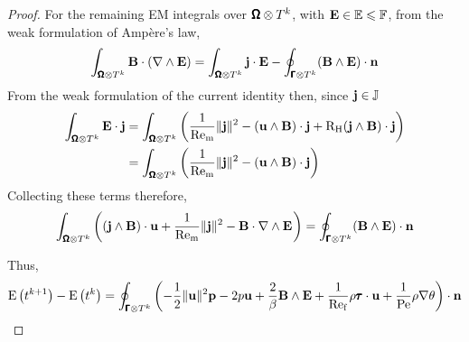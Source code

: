 \begin{proof}
            For the remaining EM integrals over $\pmb{\mathsf{\Omega}}\otimes T^{k}$, with $\mathbf{E}  \in  \mathbb{E}  \leqslant  \mathbb{F}$, from the weak formulation of Ampère's law,
            \begin{equation}
                \int_{\pmb{\mathsf{\Omega}}\otimes T^{k}}\mathbf{B}\cdot(\nabla\wedge\mathbf{E})  =  \int_{\pmb{\mathsf{\Omega}}\otimes T^{k}}\mathbf{j}\cdot\mathbf{E} - \oint_{\pmb{\mathsf{\Gamma}}\otimes T^{k}}(\mathbf{B}\wedge\mathbf{E})\cdot\mathbf{n}
            \end{equation}
            From the weak formulation of the current identity then, since $\mathbf{j}  \in  \mathbb{J}$
            \begin{align}
                \int_{\pmb{\mathsf{\Omega}}\otimes T^{k}}\mathbf{E}\cdot\mathbf{j}  &=  \int_{\pmb{\mathsf{\Omega}}\otimes T^{k}}\left(\frac{1}{\mathrm{Re}_{\mathrm{m}}}\|\mathbf{j}\|^{2} - (\mathbf{u}\wedge\mathbf{B})\cdot\mathbf{j} + \mathrm{R}_{\mathrm{H}}(\mathbf{j}\wedge\mathbf{B})\cdot\mathbf{j}\right)  \\
                &=  \int_{\pmb{\mathsf{\Omega}}\otimes T^{k}}\left(\frac{1}{\mathrm{Re}_{\mathrm{m}}}\|\mathbf{j}\|^{2} - (\mathbf{u}\wedge\mathbf{B})\cdot\mathbf{j}\right)
            \end{align}
            Collecting these terms therefore,
            \begin{equation}
                \int_{\bfOmega\otimes T^{k}}\left((\bfj\wedge\bfB)\cdot\bfu + \frac{1}{\rmRem}\|\bfj\|^{2} - \bfB\cdot\nabla\wedge\bfE\tall\right)  =  \oint_{\bfGamma\otimes T^{k}}(\bfB\wedge\bfE)\cdot\bfn
            \end{equation}
    
            Thus,
            \begin{equation}
                \mathrm{E}\left(t^{k + 1}\right) - \mathrm{E}\left(t^{k}\right)  =  \oint_{\pmb{\mathsf{\Gamma}}\otimes T^{k}}\left(- \frac{1}{2}\|\mathbf{u}\|^{2}\mathbf{p} - 2p\mathbf{u} + \frac{2}{\beta}\mathbf{B}\wedge\mathbf{E} + \frac{1}{\mathrm{Re}_{\mathrm{f}}}\rho\pmb{\mathsf{\tau}}\cdot\mathbf{u} + \frac{1}{\mathrm{Pe}}\rho\nabla\theta\right)\cdot\mathbf{n}
            \end{equation}
        \end{proof}
    

